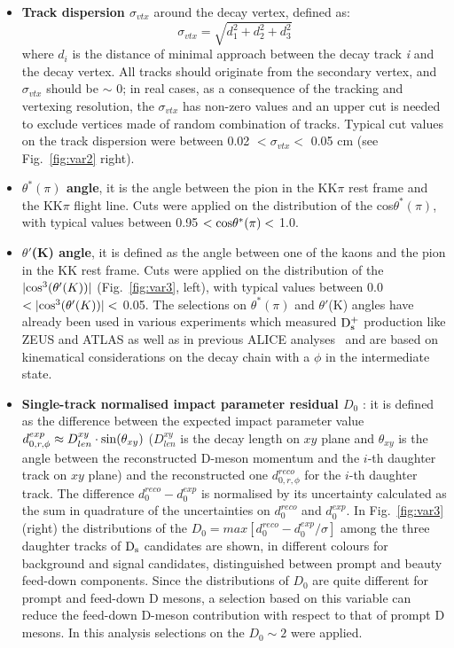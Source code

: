 \begin{itemize}
\item \textbf{Track dispersion $\sigma_{vtx}$} around the decay vertex, defined as:
\[
\sigma_{vtx}=\sqrt{d^2_1+d^2_2+d^2_3}
\]
where $d_i$ is the distance of minimal approach between the decay 
track \textit{i} and the decay vertex. All tracks should originate from 
the secondary vertex, and $\sigma_{vtx}$ should be $\sim$ 0; in 
real cases, as a consequence of the tracking and vertexing resolution, 
the $\sigma_{vtx}$ has non-zero values and an upper cut is needed 
to exclude vertices made of random combination of tracks. Typical cut
 values on the track dispersion were between 0.02 $< \sigma_{vtx}<$ 0.05 cm 
 (see Fig.~\ref{fig:var2} right).
\item \textbf{$\theta^*(\pi)$ angle}, it is the angle between the pion 
in the KK$\pi$ rest frame and the KK$\pi$ flight line. Cuts were applied
 on the distribution of the cos$\theta^*(\pi)$, with typical values 
 between 0.95 $<{\rm cos}\theta^*(\pi)  <$ 1.0.
\item \textbf{$\theta'$(K) angle}, it is defined as the angle between
 one of the kaons and the pion in the KK rest frame. Cuts were 
 applied on the distribution of the $|{\rm cos}^3(\theta'(K))|$ (Fig.~\ref{fig:var3}, left), with typical 
 values between 0.0 $<|{\rm cos}^3(\theta'(K))| <$ 0.05.
 The selections on $\theta^*(\pi)$ and $\theta'$(K) angles have already 
been used in various experiments which measured ${\rm D_s^+}$ production 
like ZEUS \cite{Chekanov:2005mm} and ATLAS \cite{ATLAS:2011fea} as well as 
in previous ALICE analyses~\cite{ALICE:2011aa,Abelev:2012tca,Adam:2016ich,Adam:2015jda}
 and are based on kinematical 
considerations on the decay chain with a $\phi$ in the intermediate state.
\item \textbf{Single-track normalised impact parameter residual $D_{0}$} : it is defined 
as the difference between the expected 
impact parameter value $d^{exp}_{0,r,\phi} \approx D_{len}^{xy} \cdot {\rm sin}(\theta_{xy})$
 ($D_{len}^{xy}$ is the decay length on $xy$ plane and $\theta_{xy}$ is the angle 
between the reconstructed D-meson momentum and the $i$-th daughter track on $xy$ plane) 
and the reconstructed one $d^{reco}_{0,r,\phi}$ for the $i$-th daughter
track. The difference $d^{reco}_{0}-d^{exp}_{0}$ is normalised by its uncertainty
calculated as the sum in quadrature of the uncertainties on $d^{reco}_{0}$ and $d^{exp}_{0}$.
In Fig.~\ref{fig:var3} (right) the distributions of the $D_{0} = max[d^{reco}_{0}-d^{exp}_{0}/\sigma]$ among 
the three daughter tracks of ${\rm D_s}$ candidates are shown, in different colours for
background and signal candidates, distinguished between prompt and beauty 
feed-down components. Since the distributions of $D_{0}$ 
are quite different for prompt and feed-down D mesons, 
a selection based on this variable can reduce the feed-down D-meson contribution with respect to 
that of prompt D mesons. In this analysis selections on the $D_{0} \sim 2$
were applied.
\end{itemize}

